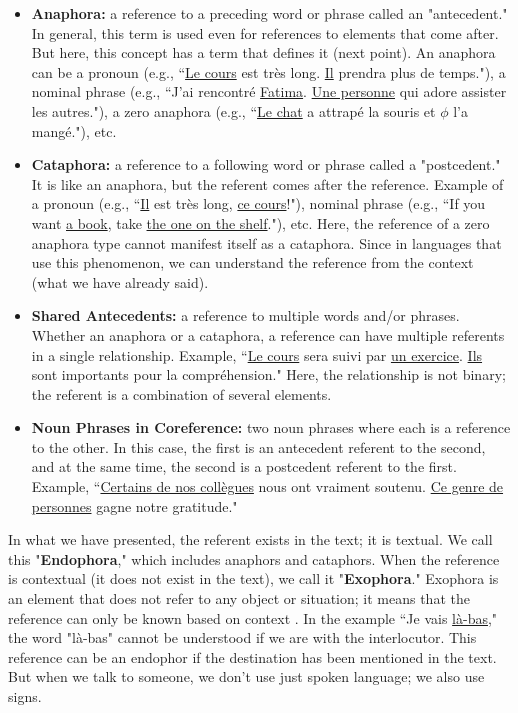 \documentclass{KBook}
\begin{document}
\begin{itemize}
	\item \textbf{Anaphora:} a reference to a preceding word or phrase called an "antecedent." In general, this term is used even for references to elements that come after. But here, this concept has a term that defines it (next point). An anaphora can be a pronoun (e.g., ``\underline{Le cours} est très long. \underline{Il} prendra plus de temps."), a nominal phrase (e.g., ``J'ai rencontré \underline{Fatima}. \underline{Une personne} qui adore assister les autres."), a zero anaphora (e.g., ``\underline{Le chat} a attrapé la souris et \underline{$ \phi $} l'a mangé."), etc.
	
	\item \textbf{Cataphora:} a reference to a following word or phrase called a "postcedent." It is like an anaphora, but the referent comes after the reference. Example of a pronoun (e.g., ``\underline{Il} est très long, \underline{ce cours}!"), nominal phrase (e.g., ``If you want \underline{a book}, take \underline{the one on the shelf}."), etc. Here, the reference of a zero anaphora type cannot manifest itself as a cataphora. Since in languages that use this phenomenon, we can understand the reference from the context (what we have already said).
	
	\item \textbf{Shared Antecedents:} a reference to multiple words and/or phrases. Whether an anaphora or a cataphora, a reference can have multiple referents in a single relationship. Example, ``\underline{Le cours} sera suivi par \underline{un exercice}. \underline{Ils} sont importants pour la compréhension." Here, the relationship is not binary; the referent is a combination of several elements.
	
	\item \textbf{Noun Phrases in Coreference:} two noun phrases where each is a reference to the other. In this case, the first is an antecedent referent to the second, and at the same time, the second is a postcedent referent to the first. Example, ``\underline{Certains de nos collègues} nous ont vraiment soutenu. \underline{Ce genre de personnes} gagne notre gratitude."
	
\end{itemize}

In what we have presented, the referent exists in the text; it is textual. We call this "\textbf{Endophora}," which includes anaphors and cataphors. When the reference is contextual (it does not exist in the text), we call it "\textbf{Exophora}." Exophora is an element that does not refer to any object or situation; it means that the reference can only be known based on context \cite{2014-halliday-hasan}. In the example ``Je vais \underline{là-bas}," the word "là-bas" cannot be understood if we are with the interlocutor. This reference can be an endophor if the destination has been mentioned in the text. But when we talk to someone, we don't use just spoken language; we also use signs.
\end{document}
